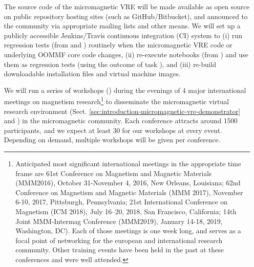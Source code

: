 \begin{workpackage}
\begin{tasklist}
\begin{task}[id=dissemination-of-oommf-nb-virtual-environment,
  title=Open source dissemination of micromagnetic VRE,
  lead=USO,PM=4,partners={SR,USH,PS}]
  The source code of the micromagnetic VRE will be made available as
  open source on public repository hosting sites (such as
  GitHub/Bitbucket), and announced to the community via appropriate
  mailing lists and other means. We will set up a publicly accessible
  Jenkins/Travis continuous integration (CI) system to (i) run
  regression tests (from
   and
  ) routinely when the
  micromagnetic VRE code or underlying OOMMF core code changes, (ii)
  re-execute notebooks (from
  ) and use them as
  regression tests (using the outcome of task
  ), and (iii) re-build
  downloadable installation files and virtual machine images.


\end{task}

\begin{task}[title=Micromagnetic VRE dissemination workshops,
id=dissemination-of-oommf-nb-workshops,lead=USO,PM=6]


We will run a series of workshops
() during the evenings of 4 major
international meetings on magnetism research\footnote{Anticipated most
  significant international meetings in the appropriate time frame are
  61st Conference on Magnetism and Magnetic Materials (MMM2016), October
  31-November 4, 2016, New Orleans, Louisiana; 62nd Conference on
  Magnetism and Magnetic Materials (MMM 2017), November 6-10, 2017, Pittsburgh,
  Pennsylvania; 21st International Conference on Magnetism (ICM 2018),
  July 16–20, 2018, San Francisco, California; 14th Joint MMM-Intermag
  Conference (MMM2019), January 14-18, 2019, Washington, DC). Each of those
  meetings is one week long, and serves as a focal point of networking
  for the european and international research community. Other training events have been held in the
past at these conferences and were well attended.} to
disseminate the micromagnetic virtual research environment
(Sect. \ref{sec:introduction-micromagnetic-vre-demonstrator} and  
) in the
micromagnetic community. Each conference
attracts around 1500 participants, and we expect at least 30 for our
workshops at every event. Depending on demand, multiple workshops
will be given per conference.


\end{task}
\end{tasklist}
\end{workpackage}
